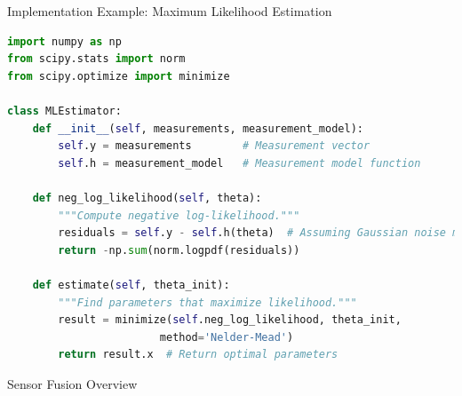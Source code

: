 \documentclass[aspectratio=169]{beamer}
\begin{document}
\begin{frame}[fragile]{Implementation Example: Maximum Likelihood Estimation}
\begin{lstlisting}[language=Python]
import numpy as np
from scipy.stats import norm
from scipy.optimize import minimize

class MLEstimator:
    def __init__(self, measurements, measurement_model):
        self.y = measurements        # Measurement vector
        self.h = measurement_model   # Measurement model function
        
    def neg_log_likelihood(self, theta):
        """Compute negative log-likelihood."""
        residuals = self.y - self.h(theta)  # Assuming Gaussian noise model
        return -np.sum(norm.logpdf(residuals))
    
    def estimate(self, theta_init):
        """Find parameters that maximize likelihood."""
        result = minimize(self.neg_log_likelihood, theta_init, 
                        method='Nelder-Mead')
        return result.x  # Return optimal parameters
\end{lstlisting}
\end{frame}

\begin{frame}{Sensor Fusion Overview}
    \begin{center}
    \end{center}
\end{frame}
\end{document}
